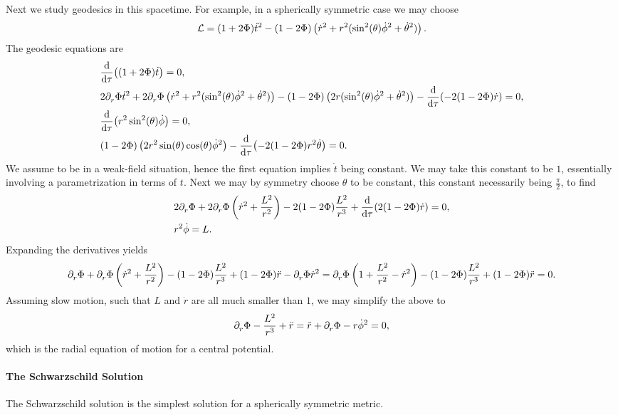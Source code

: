 Next we study geodesics in this spacetime. For example, in a spherically symmetric case we may choose
\begin{align*}
	\mathcal{L} = (1 + 2\Phi)\dot{t}^{2} - (1 - 2\Phi)\left(\dot{r}^{2} + r^{2}(\sin[2](\theta)\dot{\phi}^{2} + \dot{\theta}^{2})\right).
\end{align*}
The geodesic equations are
\begin{align*}
	&\dv{\tau}((1 + 2\Phi)\dot{t}) = 0, \\
	&2\partial^{}_{r}\Phi\dot{t}^{2} + 2\partial^{}_{r}\Phi\left(\dot{r}^{2} + r^{2}(\sin[2](\theta)\dot{\phi}^{2} + \dot{\theta}^{2})\right) - (1 - 2\Phi)\left(2r(\sin[2](\theta)\dot{\phi}^{2} + \dot{\theta}^{2})\right) - \dv{\tau}(-2(1 - 2\Phi)\dot{r}) = 0, \\
	&\dv{\tau}(r^{2}\sin[2](\theta)\dot{\phi}) = 0, \\
	&(1 - 2\Phi)\left(2r^{2}\sin(\theta)\cos(\theta)\dot{\phi}^{2}\right) - \dv{\tau}(-2(1 - 2\Phi)r^{2}\dot{\theta}) = 0.
\end{align*}
We assume to be in a weak-field situation, hence the first equation implies $\dot{t}$ being constant. We may take this constant to be $1$, essentially involving a parametrization in terms of $t$. Next we may by symmetry choose $\theta$ to be constant, this constant necessarily being $\frac{\pi}{2}$, to find
\begin{align*}
	&2\partial^{}_{r}\Phi + 2\partial^{}_{r}\Phi\left(\dot{r}^{2} + \frac{L^{2}}{r^{2}}\right) - 2(1 - 2\Phi)\frac{L^{2}}{r^{3}} + \dv{\tau}(2(1 - 2\Phi)\dot{r}) = 0, \\
	&r^{2}\dot{\phi} = L.
\end{align*}
Expanding the derivatives yields
\begin{align*}
	\partial^{}_{r}\Phi + \partial^{}_{r}\Phi\left(\dot{r}^{2} + \frac{L^{2}}{r^{2}}\right) - (1 - 2\Phi)\frac{L^{2}}{r^{3}} + (1 - 2\Phi)\ddot{r} - \partial^{}_{r}\Phi\dot{r}^{2} = \partial^{}_{r}\Phi\left(1 + \frac{L^{2}}{r^{2}} - \dot{r}^{2}\right) - (1 - 2\Phi)\frac{L^{2}}{r^{3}} + (1 - 2\Phi)\ddot{r} = 0.
\end{align*}
Assuming slow motion, such that $L$ and $\dot{r}$ are all much smaller than $1$, we may simplify the above to
\begin{align*}
	\partial^{}_{r}\Phi - \frac{L^{2}}{r^{3}} + \ddot{r} = \ddot{r} + \partial^{}_{r}\Phi - r\dot{\phi}^{2} = 0,
\end{align*}
which is the radial equation of motion for a central potential.

\paragraph{The Schwarzschild Solution}
The Schwarzschild solution is the simplest solution for a spherically symmetric metric.

